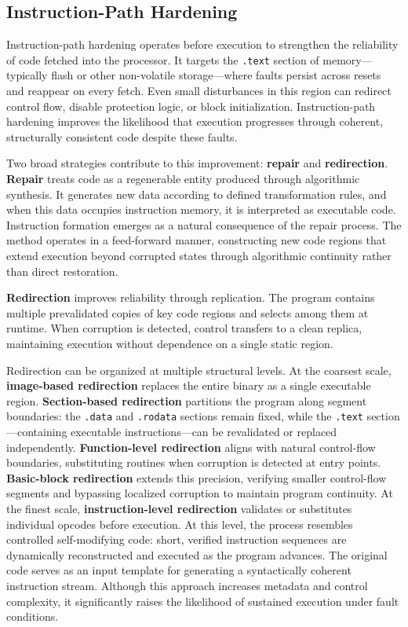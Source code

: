 \subsection{Instruction-Path Hardening}

Instruction-path hardening operates before execution to strengthen the reliability of code fetched into the processor. It targets the \texttt{.text} section of memory—typically flash or other non-volatile storage—where faults persist across resets and reappear on every fetch. Even small disturbances in this region can redirect control flow, disable protection logic, or block initialization. Instruction-path hardening improves the likelihood that execution progresses through coherent, structurally consistent code despite these faults.

Two broad strategies contribute to this improvement: \textbf{repair} and \textbf{redirection}.  
\textbf{Repair} treats code as a regenerable entity produced through algorithmic synthesis. It generates new data according to defined transformation rules, and when this data occupies instruction memory, it is interpreted as executable code. Instruction formation emerges as a natural consequence of the repair process. The method operates in a feed-forward manner, constructing new code regions that extend execution beyond corrupted states through algorithmic continuity rather than direct restoration.

\textbf{Redirection} improves reliability through replication. The program contains multiple prevalidated copies of key code regions and selects among them at runtime. When corruption is detected, control transfers to a clean replica, maintaining execution without dependence on a single static region.  

Redirection can be organized at multiple structural levels. At the coarsest scale, \textbf{image-based redirection} replaces the entire binary as a single executable region. \textbf{Section-based redirection} partitions the program along segment boundaries: the \texttt{.data} and \texttt{.rodata} sections remain fixed, while the \texttt{.text} section—containing executable instructions—can be revalidated or replaced independently.  
\textbf{Function-level redirection} aligns with natural control-flow boundaries, substituting routines when corruption is detected at entry points. \textbf{Basic-block redirection} extends this precision, verifying smaller control-flow segments and bypassing localized corruption to maintain program continuity. At the finest scale, \textbf{instruction-level redirection} validates or substitutes individual opcodes before execution. At this level, the process resembles controlled self-modifying code: short, verified instruction sequences are dynamically reconstructed and executed as the program advances. The original code serves as an input template for generating a syntactically coherent instruction stream. Although this approach increases metadata and control complexity, it significantly raises the likelihood of sustained execution under fault conditions.

